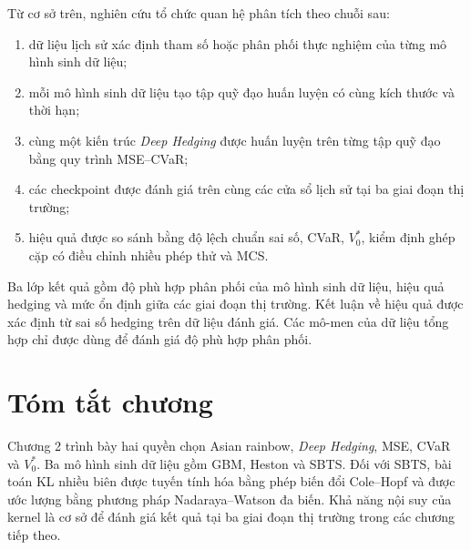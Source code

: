 Từ cơ sở trên, nghiên cứu tổ chức quan hệ phân tích theo chuỗi sau:
\begin{enumerate}[label=(\arabic*)]
    \item dữ liệu lịch sử xác định tham số hoặc phân phối thực nghiệm của từng
    mô hình sinh dữ liệu;
    \item mỗi mô hình sinh dữ liệu tạo tập quỹ đạo huấn luyện có cùng kích thước và thời
    hạn;
    \item cùng một kiến trúc \textit{Deep Hedging} được huấn luyện trên từng tập quỹ
    đạo bằng quy trình MSE--CVaR;
    \item các checkpoint được đánh giá trên cùng các cửa sổ lịch sử tại ba
    giai đoạn thị trường;
    \item hiệu quả được so sánh bằng độ lệch chuẩn sai số, CVaR, $V_0^{*}$,
    kiểm định ghép cặp có điều chỉnh nhiều phép thử và MCS.
\end{enumerate}
Ba lớp kết quả gồm độ phù hợp phân phối của mô hình sinh dữ liệu, hiệu quả
hedging và mức ổn định giữa các giai đoạn thị trường. Kết luận về hiệu quả
được xác định từ sai số hedging trên dữ liệu đánh giá. Các mô-men của dữ liệu
tổng hợp chỉ được dùng để đánh giá độ phù hợp phân phối.

\section{Tóm tắt chương}

Chương 2 trình bày hai quyền chọn Asian rainbow, \textit{Deep Hedging}, MSE,
CVaR và $V_0^{*}$. Ba mô hình sinh dữ liệu gồm GBM, Heston và SBTS. Đối với
SBTS, bài toán KL nhiều biên được tuyến tính hóa bằng phép biến đổi Cole--Hopf
và được ước lượng bằng phương pháp Nadaraya--Watson đa biến. Khả năng nội suy
của kernel là cơ sở để đánh giá kết quả tại ba giai đoạn thị trường trong các
chương tiếp theo.
